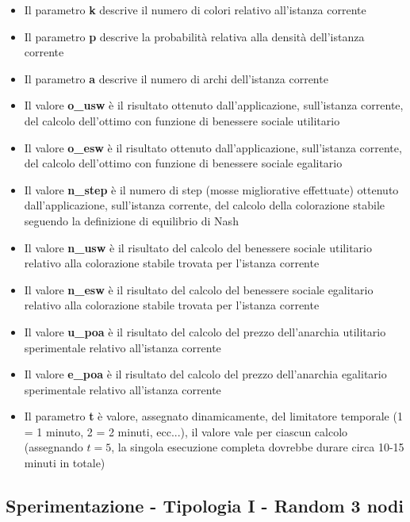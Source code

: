 \begin{itemize}
	\item Il parametro \textbf{k} descrive il numero di colori relativo all'istanza corrente
	\item Il parametro \textbf{p} descrive la probabilità relativa alla densità dell'istanza corrente
	\item Il parametro \textbf{a} descrive il numero di archi dell'istanza corrente
	\item Il valore \textbf{o\_usw} è il risultato ottenuto dall'applicazione, sull'istanza corrente, del calcolo dell'ottimo con funzione di benessere sociale utilitario
	\item Il valore \textbf{o\_esw} è il risultato ottenuto dall'applicazione, sull'istanza corrente, del calcolo dell'ottimo con funzione di benessere sociale egalitario
	\item Il valore \textbf{n\_step} è il numero di step (mosse migliorative effettuate) ottenuto dall'applicazione, sull'istanza corrente, del calcolo della colorazione stabile seguendo la definizione di equilibrio di Nash
	\item Il valore \textbf{n\_usw} è il risultato del calcolo del benessere sociale utilitario relativo alla colorazione stabile trovata per l'istanza corrente
	\item Il valore \textbf{n\_esw} è il risultato del calcolo del benessere sociale egalitario relativo alla colorazione stabile trovata per l'istanza corrente
	\item Il valore \textbf{u\_poa} è il risultato del calcolo del prezzo dell'anarchia utilitario sperimentale relativo all'istanza corrente
	\item Il valore \textbf{e\_poa} è il risultato del calcolo del prezzo dell'anarchia egalitario sperimentale relativo all'istanza corrente
	\item Il parametro \textbf{t} è valore, assegnato dinamicamente, del limitatore temporale (1 = 1 minuto, 2 = 2 minuti, ecc...), il valore vale per ciascun calcolo (assegnando \(t = 5\), la singola esecuzione completa dovrebbe durare circa 10-15 minuti in totale)
\end{itemize}


\subsection{Sperimentazione - Tipologia I - Random 3 nodi}

